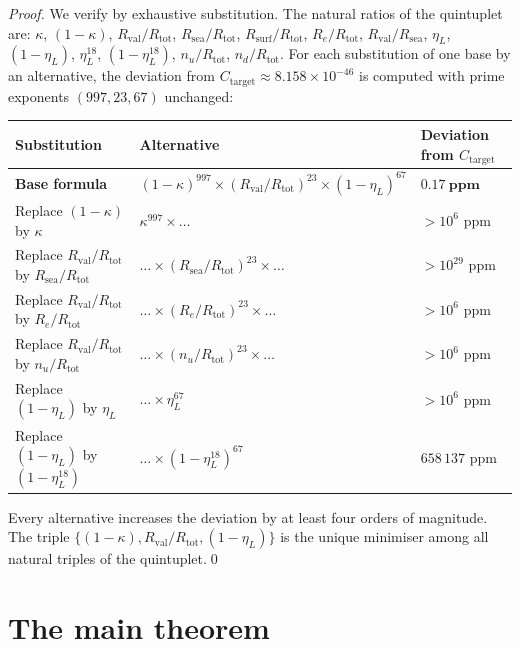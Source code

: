 \documentclass[12pt,a4paper]{article}
\newcommand{\Rsurf}{R_{\mathrm{surf}}}
\newcommand{\Rtot}{R_{\mathrm{tot}}}
\newcommand{\Rval}{R_{\mathrm{val}}}
\newcommand{\Rsea}{R_{\mathrm{sea}}}
\renewcommand{\Re}{R_e}
\newcommand{\kap}{\kappa}
\newcommand{\etaL}{\eta_L}
\begin{document}
\begin{proof}
We verify by exhaustive substitution. The natural ratios of the quintuplet are: $\kap$, $(1-\kap)$, $\Rval/\Rtot$, $\Rsea/\Rtot$, $\Rsurf/\Rtot$, $\Re/\Rtot$, $\Rval/\Rsea$, $\etaL$, $(1-\etaL)$, $\etaL^{18}$, $(1-\etaL^{18})$, $n_u/\Rtot$, $n_d/\Rtot$. For each substitution of one base by an alternative, the deviation from $C_\mathrm{target} \approx 8.158 \times 10^{-46}$ is computed with prime exponents $(997, 23, 67)$ unchanged:

\begin{center}
\renewcommand{\arraystretch}{1.3}
\begin{tabular}{p{5.5cm}p{6.8cm}p{2.4cm}}
\toprule
Substitution & Alternative & Deviation from $C_\mathrm{target}$ \\
\midrule
\textbf{Base formula} & $(1-\kap)^{997} \times (\Rval/\Rtot)^{23} \times (1-\etaL)^{67}$ & $\mathbf{0.17~\text{ppm}}$ \\
Replace $(1-\kap)$ by $\kap$ & $\kap^{997} \times \ldots$ & $>10^6$ ppm \\
Replace $\Rval/\Rtot$ by $\Rsea/\Rtot$ & $\ldots \times (\Rsea/\Rtot)^{23} \times \ldots$ & $>10^{29}$ ppm \\
Replace $\Rval/\Rtot$ by $\Re/\Rtot$ & $\ldots \times (\Re/\Rtot)^{23} \times \ldots$ & $>10^6$ ppm \\
Replace $\Rval/\Rtot$ by $n_u/\Rtot$ & $\ldots \times (n_u/\Rtot)^{23} \times \ldots$ & $>10^6$ ppm \\
Replace $(1-\etaL)$ by $\etaL$ & $\ldots \times \etaL^{67}$ & $>10^6$ ppm \\
Replace $(1-\etaL)$ by $(1-\etaL^{18})$ & $\ldots \times (1-\etaL^{18})^{67}$ & $658\,137$ ppm \\
\bottomrule
\end{tabular}
\end{center}

Every alternative increases the deviation by at least four orders of magnitude. The triple $\{(1-\kap), \Rval/\Rtot, (1-\etaL)\}$ is the unique minimiser among all natural triples of the quintuplet.\qed
\end{proof}

\section{The main theorem}
\label{sec:theorem}
\end{document}
